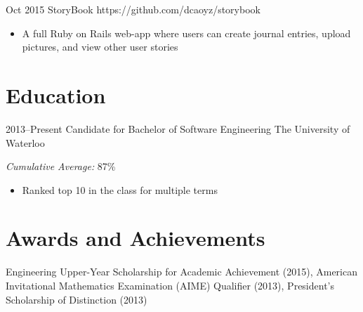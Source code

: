\documentclass[print]{friggeri-cv} %
\begin{document}
\begin{projlist}
\proj
{Oct 2015}
{StoryBook}
{https://github.com/dcaoyz/storybook}
{
\begin{itemize}
\item A full Ruby on Rails web-app where users can create journal entries, upload pictures, and view other user stories
\end{itemize}}
\end{projlist}


\section{Education}

\begin{entrylist}
\entry
{2013--Present}
{{\normalfont Candidate for} Bachelor of Software Engineering}
{The University of Waterloo}
{\emph{Cumulative Average: }{87\%}
\begin{itemize}
\item Ranked top 10 in the class for multiple terms
\end{itemize}
}
\end{entrylist}


\section{Awards and Achievements}

Engineering Upper-Year Scholarship for Academic Achievement (2015), American Invitational Mathematics Examination (AIME) Qualifier (2013), President's Scholarship of Distinction (2013)
\end{document}
